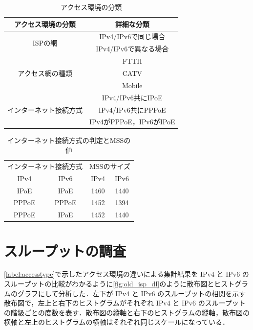 \begin{table}[htbp]
    \caption{アクセス環境の分類}
    \label{tab:accesstype}
    \begin{center}
        \begin{tabular}{cc} \hline
            アクセス環境の分類 & 詳細な分類 \\ \hline \hline
            \multirow{2}{*}{ISPの網} & IPv4/IPv6で同じ場合 \\
            & IPv4/IPv6で異なる場合 \\
            \hline
            \multirow{3}{*}{アクセス網の種類} & FTTH \\ 
            & CATV \\
            & Mobile \\
            \hline
            \multirow{3}{*}{インターネット接続方式} & IPv4/IPv6共にIPoE \\
            & IPv4/IPv6共にPPPoE \\
            & IPv4がPPPoE，IPv6がIPoE \\ \hline
        \end{tabular}
    \end{center}
\end{table}
\FloatBarrier
\begin{table}[htbp]
    \caption{インターネット接続方式の判定とMSSの値}
    \label{tab:mss}
    \begin{center}
        \begin{tabular}{cccc} \hline
            \multicolumn{2}{c}{インターネット接続方式}& \multicolumn{2}{c}{MSSのサイズ} \\
            IPv4& IPv6& IPv4& IPv6 \\ \hline \hline
            IPoE & IPoE & 1460 & 1440 \\
            PPPoE & PPPoE & 1452 & 1394 \\
            PPPoE & IPoE & 1452 & 1440 \\ \hline
        \end{tabular}
    \end{center}
\end{table}
\FloatBarrier

\section{スループットの調査}
\label{sec:throughput}
\cref{label:accesstype}で示したアクセス環境の違いによる集計結果を IPv4 と IPv6 のスループットの比較がわかるように\cref{fig:old_isp_dl}のように散布図とヒストグラムのグラフにして分析した．左下が IPv4 と IPv6 のスループットの相関を示す散布図で，左上と右下のヒストグラムがそれぞれ IPv4 と IPv6 のスループットの階級ごとの度数を表す．散布図の縦軸と右下のヒストグラムの縦軸，散布図の横軸と左上のヒストグラムの横軸はそれぞれ同じスケールになっている．

